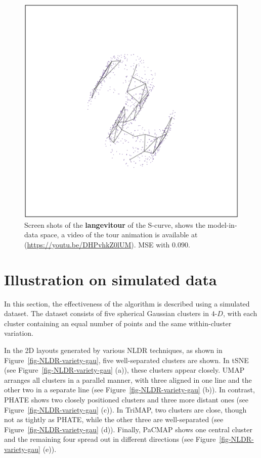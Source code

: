 \documentclass[
  12pt]{article}
\begin{document}
\begin{figure}[H]
%
\begin{minipage}{0.33\linewidth}
\includegraphics{figures/scurve/sc_bad_3.png}\end{minipage}%

\caption{\label{fig-scurve_sc_bad}Screen shots of the
\textbf{langevitour} of the S-curve, shows the model-in-data space, a
video of the tour animation is available at
(\url{https://youtu.be/DHPvhkZ0lUM}). MSE with \(0.090\).}

\end{figure}%

\section{Illustration on simulated
data}\label{illustration-on-simulated-data}

In this section, the effectiveness of the algorithm is described using a
simulated dataset. The dataset consists of five spherical Gaussian
clusters in \(4\text{-}D\), with each cluster containing an equal number
of points and the same within-cluster variation.

In the 2D layouts generated by various NLDR techniques, as shown in
Figure~\ref{fig-NLDR-variety-gau}, five well-separated clusters are
shown. In tSNE (see Figure~\ref{fig-NLDR-variety-gau} (a)), these
clusters appear closely. UMAP arranges all clusters in a parallel
manner, with three aligned in one line and the other two in a separate
line (see Figure~\ref{fig-NLDR-variety-gau} (b)). In contrast, PHATE
shows two closely positioned clusters and three more distant ones (see
Figure~\ref{fig-NLDR-variety-gau} (c)). In TriMAP, two clusters are
close, though not as tightly as PHATE, while the other three are
well-separated (see Figure~\ref{fig-NLDR-variety-gau} (d)). Finally,
PaCMAP shows one central cluster and the remaining four spread out in
different directions (see Figure~\ref{fig-NLDR-variety-gau} (e)).
\end{document}
